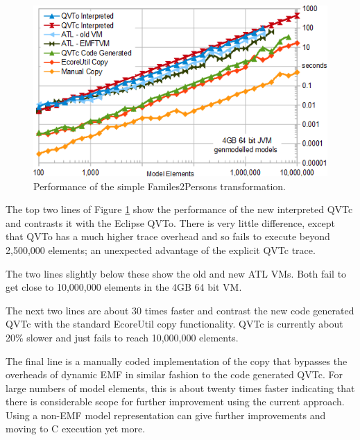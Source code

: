 \documentclass{llncs}
\begin{document}
\begin{figure}[h]
	\centering
	\includegraphics[width=1.0\textwidth]{Families2Persons.png}
	\caption{Performance of the simple Familes2Persons transformation.}
	\label{fig:Families2Persons}
\end{figure}

The top two lines of Figure \ref{fig:Families2Persons} show the performance of the new interpreted QVTc and contrasts it with the Eclipse QVTo. There is very little difference, except that QVTo has a much higher trace overhead and so fails to execute beyond 2,500,000 elements; an unexpected advantage of the explicit QVTc trace.

The two lines slightly below these show the old and new ATL VMs. Both fail to get close to 10,000,000 elements in the 4GB 64 bit VM.

The next two lines are about 30 times faster and contrast the new code generated QVTc with the standard EcoreUtil copy functionality. QVTc is currently about 20\% slower and just fails to reach 10,000,000 elements.

The final line is a manually coded implementation of the copy that bypasses the overheads of dynamic EMF in similar fashion to the code generated QVTc. For large numbers of model elements,
this is about twenty times faster indicating that there is considerable scope for further improvement using the current approach. Using a non-EMF model representation can give further improvements and moving to C execution yet more.

\end{document}
